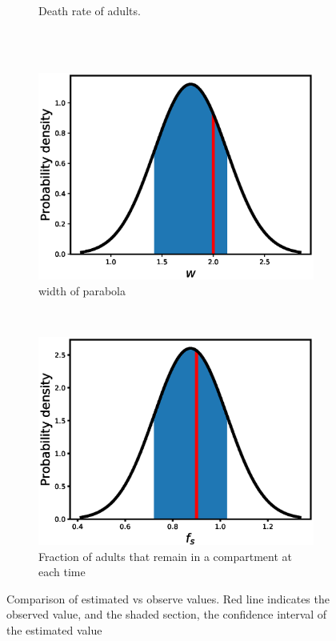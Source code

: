 \documentclass[12pt, table]{article}
\begin{document}
\begin{figure}[H]
\begin{subfigure}[b]{0.45\textwidth}
       \caption{Death rate of adults.}
       \label{fig2f}
   \end{subfigure}\\
   ~ %
   \begin{subfigure}[b]{0.45\textwidth}
       \includegraphics[width=1\textwidth, height=0.24\textheight]{figexple1/fwidth}
        \caption{width of parabola}
       \label{fig2g}
   \end{subfigure}
   ~ %
   \begin{subfigure}[b]{0.45\textwidth}
       \includegraphics[width=1\textwidth, height=0.22\textheight]{figexple1/ffs}
        \caption{Fraction of adults  that remain in a compartment at each time}
       \label{fig2h}
   \end{subfigure}
\caption{Comparison of estimated vs observe values. Red line indicates the observed value, and the shaded section, the confidence interval of the estimated value}
   \label{fig2}
\end{figure}
\end{document}
